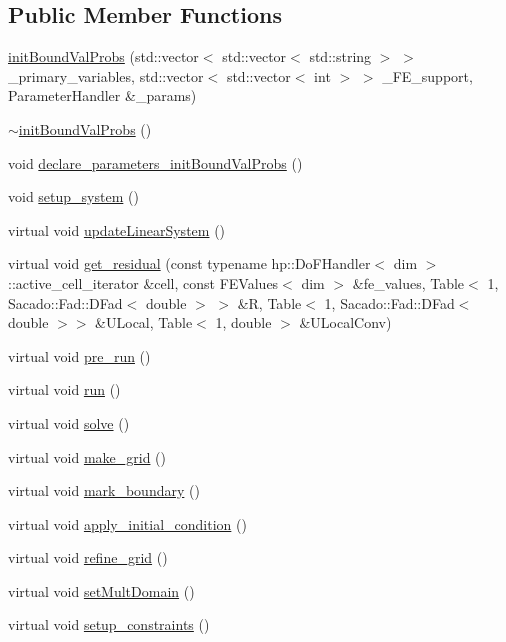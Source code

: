 \subsection*{Public Member Functions}
\begin{DoxyCompactItemize}
\item 
\hyperlink{classinit_bound_val_probs_af836a88e7f9df1d43d6f93c4747858fe}{init\-Bound\-Val\-Probs} (std\-::vector$<$ std\-::vector$<$ std\-::string $>$ $>$ \-\_\-primary\-\_\-variables, std\-::vector$<$ std\-::vector$<$ int $>$ $>$ \-\_\-\-F\-E\-\_\-support, Parameter\-Handler \&\-\_\-params)
\item 
\hyperlink{classinit_bound_val_probs_a38783cfbd559fbad9696ebd823769f53}{$\sim$init\-Bound\-Val\-Probs} ()
\item 
void \hyperlink{classinit_bound_val_probs_af60fa8844da68c0cd887b300855c086c}{declare\-\_\-parameters\-\_\-init\-Bound\-Val\-Probs} ()
\item 
void \hyperlink{classinit_bound_val_probs_a8f0c6272cf214048329d7cf1aa58b860}{setup\-\_\-system} ()
\item 
virtual void \hyperlink{classinit_bound_val_probs_af78c2c6284234c93872188334fb997d8}{update\-Linear\-System} ()
\item 
virtual void \hyperlink{classinit_bound_val_probs_ac8f2c3e2a1040c70b709900dc3dfdaea}{get\-\_\-residual} (const typename hp\-::\-Do\-F\-Handler$<$ dim $>$\-::active\-\_\-cell\-\_\-iterator \&cell, const F\-E\-Values$<$ dim $>$ \&fe\-\_\-values, Table$<$ 1, Sacado\-::\-Fad\-::\-D\-Fad$<$ double $>$ $>$ \&R, Table$<$ 1, Sacado\-::\-Fad\-::\-D\-Fad$<$ double $>$$>$ \&U\-Local, Table$<$ 1, double $>$ \&U\-Local\-Conv)
\item 
virtual void \hyperlink{classinit_bound_val_probs_a7a8df3f99e1d582c6c136b16d6e34d13}{pre\-\_\-run} ()
\item 
virtual void \hyperlink{classinit_bound_val_probs_a13a43e6d814de94978c515cb084873b1}{run} ()
\item 
virtual void \hyperlink{classinit_bound_val_probs_af7d39f0eac0af0ed5785935ac72a1e7d}{solve} ()
\item 
virtual void \hyperlink{classinit_bound_val_probs_aadd4943e52767516f3f7c5460ea35032}{make\-\_\-grid} ()
\item 
virtual void \hyperlink{classinit_bound_val_probs_a7ed791f6f2c777286743182bf2f481bf}{mark\-\_\-boundary} ()
\item 
virtual void \hyperlink{classinit_bound_val_probs_a8d32e81a32f1aaf5682065458548e8e2}{apply\-\_\-initial\-\_\-condition} ()
\item 
virtual void \hyperlink{classinit_bound_val_probs_aea55077652a6fc58f1c0c250c4abd856}{refine\-\_\-grid} ()
\item 
virtual void \hyperlink{classinit_bound_val_probs_a5fb25d0981afa1f7d87875fffcc272c1}{set\-Mult\-Domain} ()
\item 
virtual void \hyperlink{classinit_bound_val_probs_a97967f7bc5aba9a2158464d2de9d2352}{setup\-\_\-constraints} ()
\end{DoxyCompactItemize}
